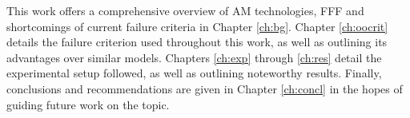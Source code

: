 \documentclass[main.tex]{subfiles}
\begin{document}
This work offers a comprehensive overview of AM technologies, FFF and shortcomings of current failure criteria in Chapter \ref{ch:bg}. Chapter \ref{ch:oocrit} details the failure criterion used throughout this work, as well as outlining its advantages over similar models. Chapters \ref{ch:exp} through \ref{ch:res} detail the experimental setup followed, as well as outlining noteworthy results. Finally, conclusions and recommendations are given in Chapter \ref{ch:concl} in the hopes of guiding future work on the topic. %

% 
%
%
%
\end{document}

